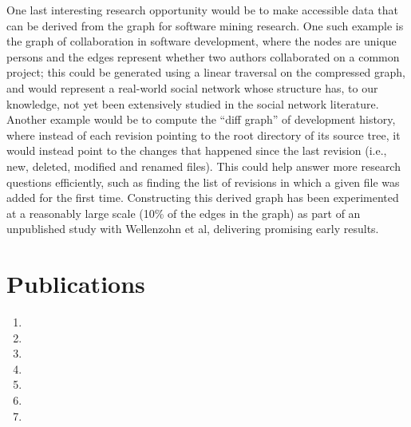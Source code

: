 One last interesting research opportunity would be to make accessible data
that can be derived from the graph for software mining research. One such
example is the graph of collaboration in software development, where the nodes
are unique persons and the edges represent whether two authors collaborated on
a common project; this could be generated using a linear traversal on the
compressed graph, and would represent a real-world social network whose
structure has, to our knowledge, not yet been extensively studied in the
social network literature. Another example would be to compute the ``diff
graph'' of development history, where instead of each revision pointing to the
root directory of its source tree, it would instead point to the changes that
happened since the last revision (i.e., new, deleted, modified and renamed
files). This could help answer more research questions efficiently, such as
finding the list of revisions in which a given file was added for the first
time. Constructing this derived graph has been experimented at a reasonably
large scale (10\% of the edges in the graph) as part of an unpublished study
with Wellenzohn et al, delivering promising early results.

\section{Publications}

\begin{enumerate}
    \item {}
    \item {}
    \item {}
    \item {}
    \item {}
    \item {}
    \item {}
\end{enumerate}
